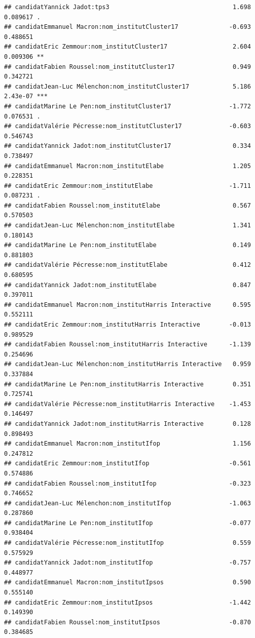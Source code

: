 \documentclass[
]{book}
\begin{document}
\begin{verbatim}
## candidatYannick Jadot:tps3                                  1.698 0.089617 .  
## candidatEmmanuel Macron:nom_institutCluster17              -0.693 0.488651    
## candidatEric Zemmour:nom_institutCluster17                  2.604 0.009306 ** 
## candidatFabien Roussel:nom_institutCluster17                0.949 0.342721    
## candidatJean-Luc Mélenchon:nom_institutCluster17            5.186 2.43e-07 ***
## candidatMarine Le Pen:nom_institutCluster17                -1.772 0.076531 .  
## candidatValérie Pécresse:nom_institutCluster17             -0.603 0.546743    
## candidatYannick Jadot:nom_institutCluster17                 0.334 0.738497    
## candidatEmmanuel Macron:nom_institutElabe                   1.205 0.228351    
## candidatEric Zemmour:nom_institutElabe                     -1.711 0.087231 .  
## candidatFabien Roussel:nom_institutElabe                    0.567 0.570503    
## candidatJean-Luc Mélenchon:nom_institutElabe                1.341 0.180143    
## candidatMarine Le Pen:nom_institutElabe                     0.149 0.881803    
## candidatValérie Pécresse:nom_institutElabe                  0.412 0.680595    
## candidatYannick Jadot:nom_institutElabe                     0.847 0.397011    
## candidatEmmanuel Macron:nom_institutHarris Interactive      0.595 0.552111    
## candidatEric Zemmour:nom_institutHarris Interactive        -0.013 0.989529    
## candidatFabien Roussel:nom_institutHarris Interactive      -1.139 0.254696    
## candidatJean-Luc Mélenchon:nom_institutHarris Interactive   0.959 0.337884    
## candidatMarine Le Pen:nom_institutHarris Interactive        0.351 0.725741    
## candidatValérie Pécresse:nom_institutHarris Interactive    -1.453 0.146497    
## candidatYannick Jadot:nom_institutHarris Interactive        0.128 0.898493    
## candidatEmmanuel Macron:nom_institutIfop                    1.156 0.247812    
## candidatEric Zemmour:nom_institutIfop                      -0.561 0.574886    
## candidatFabien Roussel:nom_institutIfop                    -0.323 0.746652    
## candidatJean-Luc Mélenchon:nom_institutIfop                -1.063 0.287860    
## candidatMarine Le Pen:nom_institutIfop                     -0.077 0.938404    
## candidatValérie Pécresse:nom_institutIfop                   0.559 0.575929    
## candidatYannick Jadot:nom_institutIfop                     -0.757 0.448977    
## candidatEmmanuel Macron:nom_institutIpsos                   0.590 0.555140    
## candidatEric Zemmour:nom_institutIpsos                     -1.442 0.149390    
## candidatFabien Roussel:nom_institutIpsos                   -0.870 0.384685    

\end{verbatim}
\end{document}
